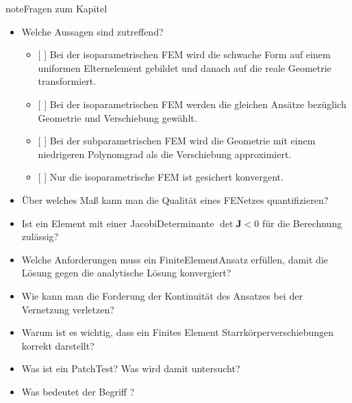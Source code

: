 \documentclass[letterpaper,10pt,german]{jupyterBook}
\begin{document}
\begin{sphinxadmonition}{note}{Fragen zum Kapitel}

\sphinxAtStartPar
{}
\begin{itemize}
\item {} 
\sphinxAtStartPar
Welche Aussagen sind zutreffend?
\begin{itemize}
\item {} 
\sphinxAtStartPar
{[} {]} Bei der isoparametrischen FEM wird die schwache Form auf einem uniformen Elternelement gebildet und danach auf die reale Geometrie transformiert.

\item {} 
\sphinxAtStartPar
{[} {]} Bei der isoparametrischen FEM werden die gleichen Ansätze bezüglich Geometrie und Verschiebung gewählt.

\item {} 
\sphinxAtStartPar
{[} {]} Bei der subparametrischen FEM wird die Geometrie mit einem niedrigeren Polynomgrad als die Verschiebung approximiert.

\item {} 
\sphinxAtStartPar
{[} {]} Nur die isoparametrische FEM ist gesichert konvergent.

\end{itemize}

\item {} 
\sphinxAtStartPar
Über welches Maß kann man die Qualität eines FE\sphinxhyphen{}Netzes quantifizieren?

\item {} 
\sphinxAtStartPar
Ist ein Element mit einer Jacobi\sphinxhyphen{}Determinante \(\det \boldsymbol{J} < 0 \) für die Berechnung zulässig?

\item {} 
\sphinxAtStartPar
Welche Anforderungen muss ein Finite\sphinxhyphen{}Element\sphinxhyphen{}Ansatz erfüllen, damit die Lösung gegen die analytische Lösung konvergiert?

\item {} 
\sphinxAtStartPar
Wie kann man die Forderung der Kontinuität des Ansatzes bei der Vernetzung verletzen?

\item {} 
\sphinxAtStartPar
Warum ist es wichtig, dass ein Finites Element Starrkörperverschiebungen korrekt darstellt?

\item {} 
\sphinxAtStartPar
Was ist ein Patch\sphinxhyphen{}Test? Was wird damit untersucht?

\item {} 
\sphinxAtStartPar
Was bedeutet der Begriff ?

\end{itemize}
\end{sphinxadmonition}
\end{document}
